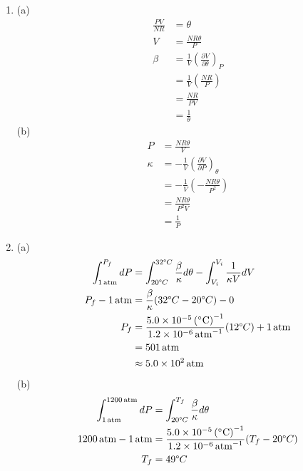 \documentclass[a4paper,12pt]{article}
\begin{document}
\begin{enumerate}
	\item (a)
	\begin{align*}
		\frac{PV}{NR} &= \theta \\
		V &= \frac{NR\theta}{P} \\
		\beta &= \frac{1}{V} \left( \frac{\partial V}{\partial \theta} \right)_P \\
		&= \frac{1}{V} \left( \frac{NR}{P} \right) \\
		&= \frac{NR}{PV} \\
		&= \frac{1}{\theta}
	\end{align*}
	(b)
	\begin{align*}
		P &= \frac{NR\theta}{V} \\
		\kappa &= - \frac{1}{V} \left( \frac{\partial V}{\partial P} \right)_\theta \\
		&= - \frac{1}{V} \left( -\frac{NR\theta}{P^2} \right) \\
		&= \frac{NR\theta}{P^2 V} \\
		&= \frac{1}{P}
	\end{align*}
	
	\item (a)
	\begin{align*}
		\int_{\SI{1}{atm}}^{P_f} dP &= \int_{20\degree C}^{32\degree C} \frac{\beta}{\kappa} d\theta - \int_{V_i}^{V_i} \frac{1}{\kappa V} dV\\
		P_f - \SI{1}{atm} &= \frac{\beta}{\kappa} (32\degree C - 20\degree C) - 0 \\
		P_f &= \frac{\SI{5.0e-5}{(\degree C)^{-1}}}{\SI{1.2e-6}{atm^{-1}}} (12\degree C) + \SI{1}{atm} \\
		&= \SI{501}{atm} \\
		&\approx \SI{5.0e2}{atm}
	\end{align*}
	(b)
	\begin{align*}
		\int_{\SI{1}{atm}}^{\SI{1200}{atm}} dP &= \int_{20\degree C}^{T_f} \frac{\beta}{\kappa} d\theta \\
		\SI{1200}{atm} - \SI{1}{atm} &= \frac{\SI{5.0e-5}{(\degree C)^{-1}}}{\SI{1.2e-6}{atm^{-1}}} (T_f - 20\degree C) \\
		T_f &= 49\degree C
	\end{align*}
	

\end{enumerate}
\end{document}
